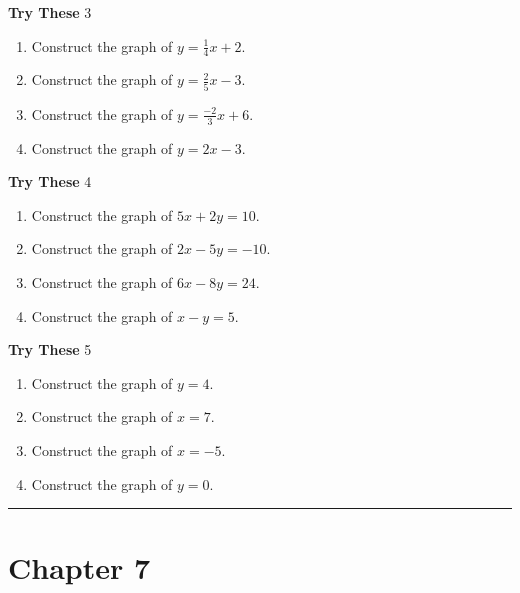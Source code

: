 \documentclass[a4paper]{JAC2003}
\begin{document}
\noindent\textcolor{red!75!black}{\textbf{Try These}} 3
\begin{enumerate}
\item Construct the graph of $y=\frac{1}{4} x+2$.

\item Construct the graph of $y=\frac{2}{5} x-3$.

\item Construct the graph of $y=\frac{-2}{3} x+6$.

\item Construct the graph of $y=2 x-3$.
\end{enumerate}

\noindent\textcolor{red!75!black}{\textbf{Try These}} 4
\begin{enumerate}
\item Construct the graph of $5 x+2 y=10$.

\item Construct the graph of $2 x-5 y=-10$.

\item Construct the graph of $6 x-8 y=24$.

\item Construct the graph of $x-y=5$.
\end{enumerate}

\noindent\textcolor{red!75!black}{\textbf{Try These}} 5
\begin{enumerate}
\item Construct the graph of $y=4$.

\item Construct the graph of $x=7$.

\item Construct the graph of $x=-5$.

\item Construct the graph of $y=0$.
\end{enumerate}
\noindent\rule[0.5ex]{\linewidth}{1pt}

\section{Chapter 7}
\end{document}
